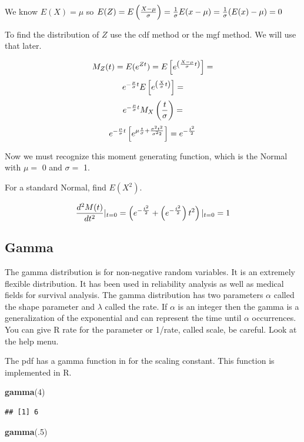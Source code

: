 \documentclass[]{book}
\newenvironment{Shaded}{\begin{snugshade}}{\end{snugshade}}
\newcommand{\KeywordTok}[1]{\textcolor[rgb]{0.13,0.29,0.53}{\textbf{#1}}}
\newcommand{\DecValTok}[1]{\textcolor[rgb]{0.00,0.00,0.81}{#1}}
\newcommand{\NormalTok}[1]{#1}
\theoremstyle{definition}
\theoremstyle{definition}
\theoremstyle{definition}
\theoremstyle{remark}
\begin{document}
We know \(E(X)=\mu\) so
\(E(Z)=E\left( {X - \mu \over \sigma} \right)={1\over \sigma}E(x-\mu)={1\over \sigma}(E(x)-\mu)=0\)

To find the distribution of \(Z\) use the cdf method or the mgf method.
We will use that later.

\[M_{Z}(t)=E(e^{Zt})=E\left[e^{\left( {X - \mu \over \sigma}t \right)} \right] = \]
\[e^{-{\mu \over \sigma}t}E\left[e^{\left( {X  \over \sigma}t \right)} \right] = \]
\[e^{-{\mu \over \sigma}t}M_{X}\left( {t  \over \sigma}\right)=\]
\[e^{-{\mu \over \sigma}t}\left[e^{\mu {t \over \sigma} + {\sigma ^2 t^2 \over \sigma^2 2}}\right]=e^{-{t^2 \over 2}}\]

Now we must recognize this moment generating function, which is the
Normal with \(\mu =\) 0 and \(\sigma =\) 1.

For a standard Normal, find \(E(X^2)\).

\[{d^2M(t) \over dt^2}\vert_{t=0}=\left(e^{-{t^2 \over 2}}+\left(e^{-{t^2 \over 2}}\right) t^2 \right)\vert_{t=0}=1\]

\subsection{Gamma}\label{gamma}

The gamma distribution is for non-negative random variables. It is an
extremely flexible distribution. It has been used in reliability
analysis as well as medical fields for survival analysis. The gamma
distribution has two parameters \(\alpha\) called the shape parameter
and \(\lambda\) called the rate. If \(\alpha\) is an integer then the
gamma is a generalization of the exponential and can represent the time
until \(\alpha\) occurrences. You can give R rate for the parameter or
1/rate, called scale, be careful. Look at the help menu.

The pdf has a gamma function in for the scaling constant. This function
is implemented in R.

\begin{Shaded}
\begin{Highlighting}[]
\KeywordTok{gamma}\NormalTok{(}\DecValTok{4}\NormalTok{)}
\end{Highlighting}
\end{Shaded}

\begin{verbatim}
## [1] 6
\end{verbatim}

\begin{Shaded}
\begin{Highlighting}[]
\KeywordTok{gamma}\NormalTok{(.}\DecValTok{5}\NormalTok{)}
\end{Highlighting}
\end{Shaded}
\end{document}

